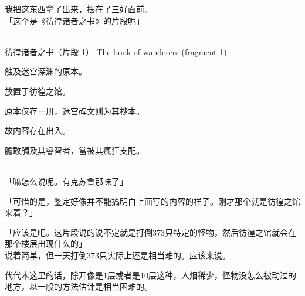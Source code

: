 我把这东西拿了出来，摆在了三好面前。\\

「这个是《彷徨诸者之书》的片段呢」\\

  --------

  彷徨诸者之书（片段 1） The book of wanderers (fragment 1)

%  
 

  触及迷宫深渊的原本。

  放置于彷徨之馆。

%  
 

  原本仅存一册，迷宫碑文则为其抄本。

  故内容存在出入。

%  
 

  膽敢觸及其睿智者，當被其瘋狂支配。

  --------\\

「嘛怎么说呢。有克苏鲁那味了」

「可惜的是，鉴定好像并不能搞明白上面写的内容的样子。刚才那个就是彷徨之馆来着？」

「应该是吧。这片段说的说不定就是打倒373只特定的怪物，然后彷徨之馆就会在那个楼层出现什么的」\\

说着简单，但一天打倒373只实际上还是相当难的。应该来说。

代代木这里的话，除开像是1层或者是10层这种，人烟稀少，怪物没怎么被动过的地方，以一般的方法估计是相当困难的。\\

